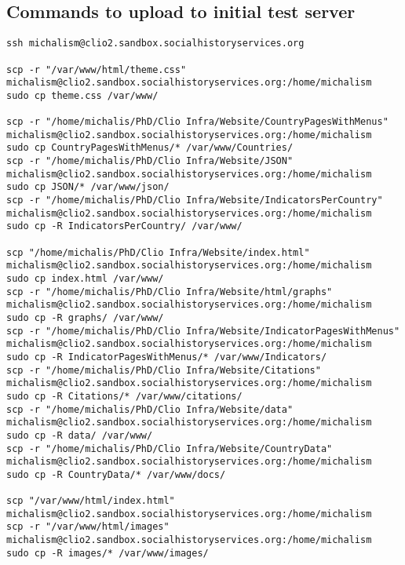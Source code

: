 \documentclass[a4paper]{article}
\begin{document}
\subsection{Commands to upload to initial test server}
\begin{verbatim}
ssh michalism@clio2.sandbox.socialhistoryservices.org

scp -r "/var/www/html/theme.css" 
michalism@clio2.sandbox.socialhistoryservices.org:/home/michalism
sudo cp theme.css /var/www/

scp -r "/home/michalis/PhD/Clio Infra/Website/CountryPagesWithMenus" 
michalism@clio2.sandbox.socialhistoryservices.org:/home/michalism
sudo cp CountryPagesWithMenus/* /var/www/Countries/
scp -r "/home/michalis/PhD/Clio Infra/Website/JSON" 
michalism@clio2.sandbox.socialhistoryservices.org:/home/michalism
sudo cp JSON/* /var/www/json/
scp -r "/home/michalis/PhD/Clio Infra/Website/IndicatorsPerCountry" 
michalism@clio2.sandbox.socialhistoryservices.org:/home/michalism
sudo cp -R IndicatorsPerCountry/ /var/www/

scp "/home/michalis/PhD/Clio Infra/Website/index.html" 
michalism@clio2.sandbox.socialhistoryservices.org:/home/michalism
sudo cp index.html /var/www/
scp -r "/home/michalis/PhD/Clio Infra/Website/html/graphs" 
michalism@clio2.sandbox.socialhistoryservices.org:/home/michalism
sudo cp -R graphs/ /var/www/
scp -r "/home/michalis/PhD/Clio Infra/Website/IndicatorPagesWithMenus" 
michalism@clio2.sandbox.socialhistoryservices.org:/home/michalism
sudo cp -R IndicatorPagesWithMenus/* /var/www/Indicators/
scp -r "/home/michalis/PhD/Clio Infra/Website/Citations" 
michalism@clio2.sandbox.socialhistoryservices.org:/home/michalism
sudo cp -R Citations/* /var/www/citations/
scp -r "/home/michalis/PhD/Clio Infra/Website/data" 
michalism@clio2.sandbox.socialhistoryservices.org:/home/michalism
sudo cp -R data/ /var/www/
scp -r "/home/michalis/PhD/Clio Infra/Website/CountryData" 
michalism@clio2.sandbox.socialhistoryservices.org:/home/michalism
sudo cp -R CountryData/* /var/www/docs/

scp "/var/www/html/index.html" 
michalism@clio2.sandbox.socialhistoryservices.org:/home/michalism
scp -r "/var/www/html/images" 
michalism@clio2.sandbox.socialhistoryservices.org:/home/michalism
sudo cp -R images/* /var/www/images/
\end{verbatim}
\fi

\end{document}
